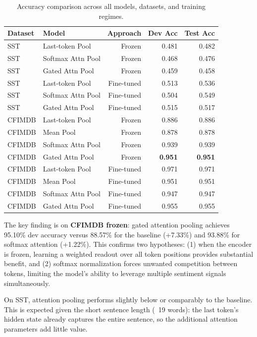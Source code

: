 \documentclass[9pt,twocolumn,twoside,lineno]{gsag3jnl}
\begin{document}
\begin{table}[t]
\centering
\caption{Accuracy comparison across all models, datasets, and training regimes.}
\label{tab:results}
\begin{tableminipage}{\textwidth}
\begin{tabular}{@{}llrrr@{}}
\toprule
Dataset & Model & Approach & Dev Acc & Test Acc \\
\midrule
SST & Last-token Pool & Frozen & 0.481 & 0.482 \\
SST & Softmax Attn Pool & Frozen & 0.468 & 0.476 \\
SST & Gated Attn Pool & Frozen & 0.459 & 0.458 \\
SST & Last-token Pool & Fine-tuned & 0.513 & 0.536 \\
SST & Softmax Attn Pool & Fine-tuned & 0.504 & 0.549 \\
SST & Gated Attn Pool & Fine-tuned & 0.515 & 0.517 \\
\midrule
CFIMDB & Last-token Pool & Frozen & 0.886 & 0.886 \\
CFIMDB & Mean Pool & Frozen & 0.878 & 0.878 \\
CFIMDB & Softmax Attn Pool & Frozen & 0.939 & 0.939 \\
CFIMDB & Gated Attn Pool & Frozen & \textbf{0.951} & \textbf{0.951} \\
CFIMDB & Last-token Pool & Fine-tuned & 0.971 & 0.971 \\
CFIMDB & Mean Pool & Fine-tuned & 0.951 & 0.951 \\
CFIMDB & Softmax Attn Pool & Fine-tuned & 0.947 & 0.947 \\
CFIMDB & Gated Attn Pool & Fine-tuned & 0.955 & 0.955 \\
\bottomrule
\end{tabular}
\end{tableminipage}
\end{table}

The key finding is on \textbf{CFIMDB frozen}: gated attention pooling achieves 95.10\% dev accuracy versus 88.57\% for the baseline (+7.33\%) and 93.88\% for softmax attention (+1.22\%). This confirms two hypotheses: (1) when the encoder is frozen, learning a weighted readout over all token positions provides substantial benefit, and (2) softmax normalization forces unwanted competition between tokens, limiting the model's ability to leverage multiple sentiment signals simultaneously.

On SST, attention pooling performs slightly below or comparably to the baseline. This is expected given the short sentence length (~19 words): the last token's hidden state already captures the entire sentence, so the additional attention parameters add little value.
\end{document}
